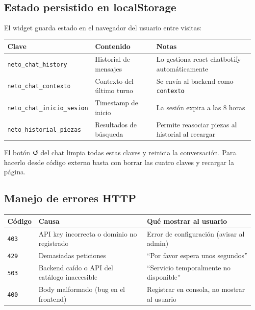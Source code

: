 \documentclass[12pt, a4paper]{article}
\begin{document}
\subsection{Estado persistido en localStorage}

El widget guarda estado en el navegador del usuario entre visitas:

\begin{center}
\renewcommand{\arraystretch}{1.25}
\begin{tabularx}{\textwidth}{llX}
\toprule
\textbf{Clave} & \textbf{Contenido} & \textbf{Notas} \\
\midrule
\texttt{neto\_chat\_history}        & Historial de mensajes    & Lo gestiona react-chatbotify automáticamente \\
\texttt{neto\_chat\_contexto}       & Contexto del último turno & Se envía al backend como \texttt{contexto} \\
\texttt{neto\_chat\_inicio\_sesion} & Timestamp de inicio       & La sesión expira a las 8 horas \\
\texttt{neto\_historial\_piezas}    & Resultados de búsqueda    & Permite reasociar piezas al historial al recargar \\
\bottomrule
\end{tabularx}
\end{center}

El botón ↺ del chat limpia todas estas claves y reinicia la conversación. Para hacerlo desde código externo basta con borrar las cuatro claves y recargar la página.

\subsection{Manejo de errores HTTP}

\begin{center}
\renewcommand{\arraystretch}{1.25}
\begin{tabularx}{\textwidth}{llX}
\toprule
\textbf{Código} & \textbf{Causa} & \textbf{Qué mostrar al usuario} \\
\midrule
\texttt{403} & API key incorrecta o dominio no registrado & Error de configuración (avisar al admin) \\
\texttt{429} & Demasiadas peticiones & ``Por favor espera unos segundos'' \\
\texttt{503} & Backend caído o API del catálogo inaccesible & ``Servicio temporalmente no disponible'' \\
\texttt{400} & Body malformado (bug en el frontend) & Registrar en consola, no mostrar al usuario \\
\bottomrule
\end{tabularx}
\end{center}
\end{document}
